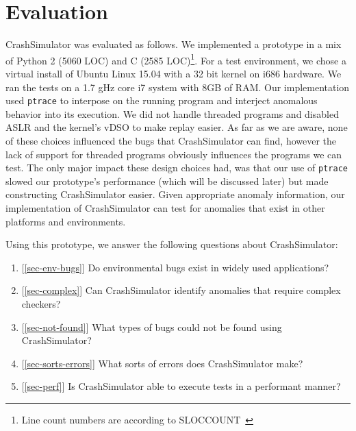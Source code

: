 \section{Evaluation}
\label{sec:evaluation}



CrashSimulator was evaluated as follows.
We implemented a prototype in a mix of Python 2 (5060 LOC) and C (2585 
LOC)\footnote{ Line count numbers are according to SLOCCOUNT~\cite{SLOCCOUNT}}.  
For a test
environment, we chose a virtual install of Ubuntu Linux 15.04 with a 32 bit 
kernel on i686 hardware.
We ran the tests on a 1.7 gHz core i7 system with 8GB of RAM. Our
implementation used {\tt ptrace} to interpose on the running program and
interject anomalous behavior into its execution.
We did not handle threaded programs and disabled ASLR and the kernel's vDSO 
to make replay easier.  As far as we are aware, none of these choices 
influenced the bugs that CrashSimulator can find, however the lack of support
for threaded programs obviously influences the programs we can test.  The 
only major impact these design choices had, was that our use of {\tt ptrace} 
slowed our prototype's performance (which will be discussed later) but made
constructing CrashSimulator easier.  Given appropriate anomaly information, 
our implementation of CrashSimulator can
test for anomalies that exist in other platforms and environments.  

Using this prototype, we answer the following questions about CrashSimulator:

\begin{enumerate}
   \item{[\ref{sec-env-bugs}] Do environmental bugs exist in widely used applications?}
   \item{[\ref{sec-complex}] Can CrashSimulator identify anomalies that require
       complex checkers?}
   \item{[\ref{sec-not-found}] What types of bugs could not be found using CrashSimulator?}
   \item{[\ref{sec-sorts-errors}] What sorts of errors does CrashSimulator make?}
   \item{[\ref{sec-perf}] Is CrashSimulator able to execute tests in a performant manner?}
\end{enumerate}



